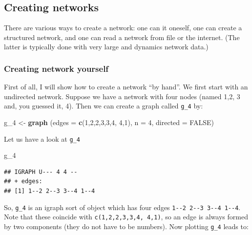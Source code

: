 \documentclass[]{article}
\newenvironment{Shaded}{\begin{snugshade}}{\end{snugshade}}
\newcommand{\KeywordTok}[1]{\textcolor[rgb]{0.13,0.29,0.53}{\textbf{{#1}}}}
\newcommand{\DataTypeTok}[1]{\textcolor[rgb]{0.13,0.29,0.53}{{#1}}}
\newcommand{\DecValTok}[1]{\textcolor[rgb]{0.00,0.00,0.81}{{#1}}}
\newcommand{\StringTok}[1]{\textcolor[rgb]{0.31,0.60,0.02}{{#1}}}
\newcommand{\OtherTok}[1]{\textcolor[rgb]{0.56,0.35,0.01}{{#1}}}
\newcommand{\NormalTok}[1]{{#1}}
\begin{document}
\subsection{Creating networks}\label{creating-networks}

There are various ways to create a network: one can it oneself, one can
create a structured network, and one can read a network from file or the
internet. (The latter is typically done with very large and dynamics
network data.)

\subsubsection{Creating network
yourself}\label{creating-network-yourself}

First of all, I will show how to create a network ``by hand''. We first
start with an undirected network. Suppose we have a network with four
nodes (named 1,2, 3 and, you guessed it, 4). Then we can create a graph
called \texttt{g\_4} by:

\begin{Shaded}
\begin{Highlighting}[]
\NormalTok{g_4 <-}\StringTok{ }\KeywordTok{graph} \NormalTok{(}\DataTypeTok{edges =} \KeywordTok{c}\NormalTok{(}\DecValTok{1}\NormalTok{,}\DecValTok{2}\NormalTok{,}\DecValTok{2}\NormalTok{,}\DecValTok{3}\NormalTok{,}\DecValTok{3}\NormalTok{,}\DecValTok{4}\NormalTok{, }\DecValTok{4}\NormalTok{,}\DecValTok{1}\NormalTok{), }\DataTypeTok{n =} \DecValTok{4}\NormalTok{, }\DataTypeTok{directed =} \OtherTok{FALSE}\NormalTok{)}
\end{Highlighting}
\end{Shaded}

Let us have a look at \texttt{g\_4}

\begin{Shaded}
\begin{Highlighting}[]
\NormalTok{g_4}
\end{Highlighting}
\end{Shaded}

\begin{verbatim}
## IGRAPH U--- 4 4 -- 
## + edges:
## [1] 1--2 2--3 3--4 1--4
\end{verbatim}

So, \texttt{g\_4} is an igraph sort of object which has four edges
\texttt{1-\/-2\ 2-\/-3\ 3-\/-4\ 1-\/-4}. Note that these coincide with
\texttt{c(1,2,2,3,3,4,\ 4,1)}, so an edge is always formed by two
components (they do not have to be numbers). Now plotting \texttt{g\_4}
leads to:
\end{document}

